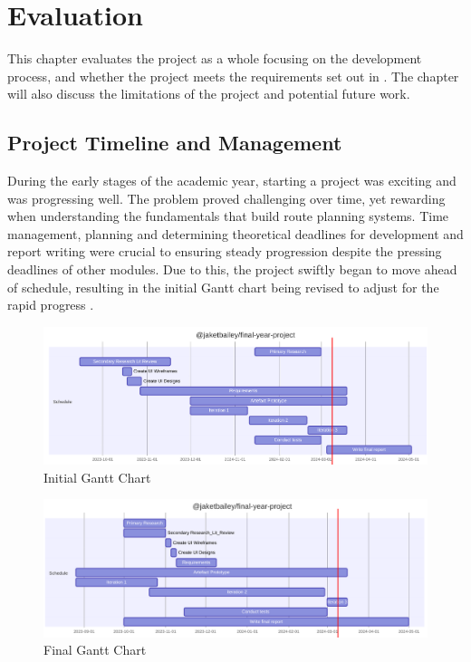 \chapter{Evaluation}
\label{chap:evaluation}

This chapter evaluates the project as a whole focusing on the development process, and whether the project meets the requirements set out in . The chapter will also discuss the limitations of the project and potential future work.

\section{Project Timeline and Management}
\label{evaluation:timeline-management}

During the early stages of the academic year, starting a project was exciting and was progressing well. The problem proved challenging over time, yet rewarding when understanding the fundamentals that build route planning systems. Time management, planning and determining theoretical deadlines for development and report writing were crucial to ensuring steady progression despite the pressing deadlines of other modules. Due to this, the project swiftly began to move ahead of schedule, resulting in the initial Gantt chart  being revised to adjust for the rapid progress .

\begin{figure}[ht!]
    \centering
    \includegraphics[width=1\linewidth]{figures/Old FYP Gantt - Timeline 1.pdf}
    \caption{Initial Gantt Chart}
    \label{fig:initial-gantt}
\end{figure}

\begin{figure}[h!]
    \centering
    \includegraphics[width=1\linewidth]{figures/Actual FYP Gantt.pdf}
    \caption{Final Gantt Chart}
    \label{fig:final-gantt}
\end{figure}

